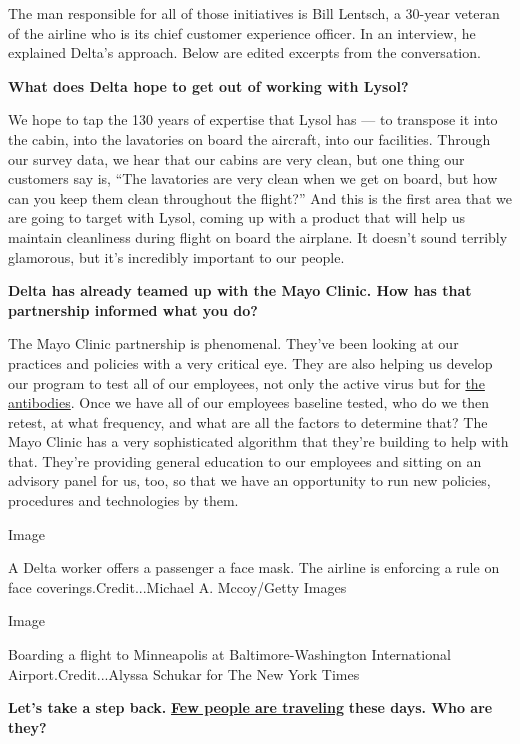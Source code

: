 The man responsible for all of those initiatives is Bill Lentsch, a
30-year veteran of the airline who is its chief customer experience
officer. In an interview, he explained Delta's approach. Below are
edited excerpts from the conversation.

\textbf{What does Delta hope to get out of working with Lysol?}

We hope to tap the 130 years of expertise that Lysol has --- to
transpose it into the cabin, into the lavatories on board the aircraft,
into our facilities. Through our survey data, we hear that our cabins
are very clean, but one thing our customers say is, ``The lavatories are
very clean when we get on board, but how can you keep them clean
throughout the flight?'' And this is the first area that we are going to
target with Lysol, coming up with a product that will help us maintain
cleanliness during flight on board the airplane. It doesn't sound
terribly glamorous, but it's incredibly important to our people.

\textbf{Delta has already teamed up with the Mayo Clinic. How has that
partnership informed what you do?}

The Mayo Clinic partnership is phenomenal. They've been looking at our
practices and policies with a very critical eye. They are also helping
us develop our program to test all of our employees, not only the active
virus but for
\href{https://www.nytimes.com/2020/07/26/health/coronvirus-antibody-tests.html?action=click\&module=Top\%20Stories\&pgtype=Homepage}{the
antibodies}. Once we have all of our employees baseline tested, who do
we then retest, at what frequency, and what are all the factors to
determine that? The Mayo Clinic has a very sophisticated algorithm that
they're building to help with that. They're providing general education
to our employees and sitting on an advisory panel for us, too, so that
we have an opportunity to run new policies, procedures and technologies
by them.

Image

A Delta worker offers a passenger a face mask. The airline is enforcing
a rule on face coverings.Credit...Michael A. Mccoy/Getty Images

Image

Boarding a flight to Minneapolis at Baltimore-Washington International
Airport.Credit...Alyssa Schukar for The New York Times

\textbf{Let's take a step back.}
\textbf{\href{https://www.nytimes.com/2020/05/10/business/airlines-coronavirus-bleak-future.html}{Few
people are traveling}} \textbf{these days. Who are they?}

